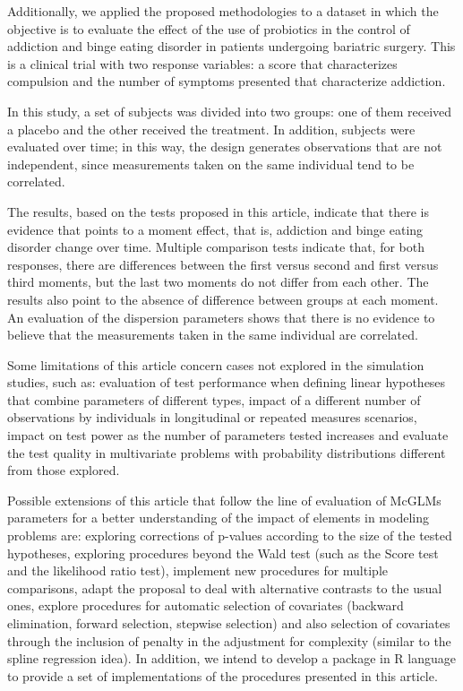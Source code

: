 \documentclass[AMA,STIX1COL]{WileyNJD-v2}
\begin{document}
Additionally, we applied the proposed methodologies to a dataset in which the objective is to evaluate the effect of the use of probiotics in the control of addiction and binge eating 
disorder in patients undergoing bariatric surgery. This is a clinical trial with two response variables: a score that characterizes compulsion and the number of symptoms presented that characterize addiction.

In this study, a set of subjects was divided into two groups: one of them received a placebo and the other received the treatment. 
In addition, subjects were evaluated over time; in this way, the design generates observations that are not independent, since measurements taken on the same individual tend to be correlated.

The results, based on the tests proposed in this article, indicate that there is evidence that points to a moment effect, that is, addiction and binge eating disorder change over time. 
Multiple comparison tests indicate that, for both responses, there are differences between the first versus second and first versus third moments, but the last two moments do not differ from each other. 
The results also point to the absence of difference between groups at each moment. An evaluation of the dispersion parameters shows that there is no evidence to believe that the measurements taken in the same individual are correlated.

Some limitations of this article concern cases not explored in the simulation studies, such as: evaluation of test performance when defining linear hypotheses that combine parameters of different types, impact of a different number of observations by individuals in longitudinal or repeated measures scenarios, impact on test power as the number of parameters tested increases and evaluate the test quality in multivariate problems with probability distributions different from those explored.

Possible extensions of this article that follow the line of evaluation of McGLMs parameters for a better understanding of the impact of elements in modeling problems are: exploring corrections of p-values according to the size of the tested hypotheses, exploring procedures beyond the Wald test (such as the Score test and the likelihood ratio test), implement new procedures for multiple comparisons, adapt the proposal to deal with alternative contrasts to the usual ones, explore procedures for automatic selection of covariates (backward elimination, forward selection, stepwise selection) and also selection of covariates through the inclusion of penalty in the adjustment for complexity (similar to the spline regression idea). In addition, we intend to develop a package in R language to provide a set of implementations of the procedures presented in this article.
\end{document}
